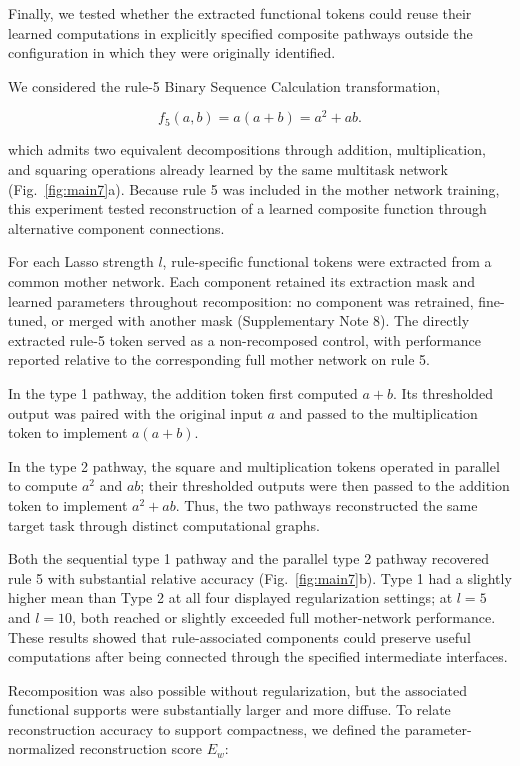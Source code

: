 \documentclass{article}
\begin{document}
Finally, we tested whether the extracted functional tokens could reuse their learned computations in explicitly specified composite pathways outside the configuration in which they were originally identified.

We considered the rule-5 Binary Sequence Calculation transformation,

\[f_5(a,b)=a(a+b)=a^2+ab.\]

which admits two equivalent decompositions through addition, multiplication, and squaring operations already learned by the same multitask network (Fig.~\ref{fig:main7}a). Because rule 5 was included in the mother network training, this experiment tested reconstruction of a learned composite function through alternative component connections.

For each Lasso strength \(l\), rule-specific functional tokens were extracted from a common mother network. Each component retained its extraction mask and learned parameters throughout recomposition: no component was retrained, fine-tuned, or merged with another mask (Supplementary Note 8). The directly extracted rule-5 token served as a non-recomposed control, with performance reported relative to the corresponding full mother network on rule 5.

In the type 1 pathway, the addition token first computed \(a + b\). Its thresholded output was paired with the original input \(a\) and passed to the multiplication token to implement \(a(a + b)\).

In the type 2 pathway, the square and multiplication tokens operated in parallel to compute \(a^{2}\) and \(ab\); their thresholded outputs were then passed to the addition token to implement \(a^{2} + ab\). Thus, the two pathways reconstructed the same target task through distinct computational graphs.

Both the sequential type 1 pathway and the parallel type 2 pathway recovered rule 5 with substantial relative accuracy (Fig.~\ref{fig:main7}b). Type 1 had a slightly higher mean than Type 2 at all four displayed regularization settings; at $l=5$ and $l=10$, both reached or slightly exceeded full mother-network performance. These results showed that rule-associated components could preserve useful computations after being connected through the specified intermediate interfaces.

Recomposition was also possible without regularization, but the associated functional supports were substantially larger and more diffuse. To relate reconstruction accuracy to support compactness, we defined the parameter-normalized reconstruction score \(E_{w}\):
\end{document}
